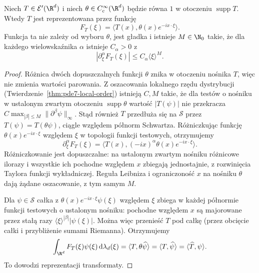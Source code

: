 \begin{lemat}
\label{lem:pde31-compact-fourier}
Niech $T\in\mathcal E'(\R^d)$ i niech
$\theta\in C_c^\infty(\R^d)$ będzie równa $1$
w otoczeniu $\operatorname{supp}T$. Wtedy
$\widehat T$ jest reprezentowana przez funkcję
\[
 F_T(\xi)=\langle T(x),\theta(x)e^{-ix\cdot\xi}\rangle.
\]
Funkcja ta nie zależy od wyboru $\theta$, jest gładka
i istnieje $M\in\N_0$ takie, że dla każdego
wielowskaźnika $\alpha$ istnieje $C_\alpha>0$ z
\[
 |\partial_\xi^\alpha F_T(\xi)|\le C_\alpha
 \langle\xi\rangle^M.
\]
\end{lemat}
\begin{proof}
Różnica dwóch dopuszczalnych funkcji $\theta$
znika w otoczeniu nośnika $T$, więc nie zmienia
wartości parowania. Z oszacowania lokalnego rzędu
dystrybucji (Twierdzenie~\ref{thm:pde7-local-order})
istnieją $C,M$ takie, że dla testów o nośniku
w ustalonym zwartym otoczeniu $\operatorname{supp}\theta$
wartość $|T(\psi)|$ nie przekracza
$C\max_{|\beta|\le M}\|\partial^\beta\psi\|_\infty$.
Stąd również $T$ przedłuża się na $\mathcal S$
przez $T(\psi)=T(\theta\psi)$, ciągle względem
półnorm Schwartza.
Różniczkując funkcję $\theta(x)e^{-ix\cdot\xi}$
względem $\xi$ w topologii funkcji testowych,
otrzymujemy
\[
 \partial_\xi^\alpha F_T(\xi)
 =\langle T(x),(-ix)^\alpha\theta(x)e^{-ix\cdot\xi}\rangle.
\]
Różniczkowanie jest dopuszczalne: na ustalonym zwartym
nośniku różnicowe ilorazy i wszystkie ich pochodne
względem $x$ zbiegają jednostajnie, z rozwinięcia
Taylora funkcji wykładniczej.
Reguła Leibniza i ograniczoność $x$ na nośniku
$\theta$ dają żądane oszacowanie, z tym samym $M$.

Dla $\psi\in\mathcal S$ całka z
$\theta(x)e^{-ix\cdot\xi}\psi(\xi)$ względem $\xi$
zbiega w każdej półnormie funkcji testowych
o ustalonym nośniku: pochodne względem $x$
są majorowane przez stałą razy
$\langle\xi\rangle^{|\beta|}|\psi(\xi)|$.
Można więc przenieść $T$ pod całkę
(przez obcięcie całki i przybliżenie sumami Riemanna).
Otrzymujemy
\[
 \int_{\R^d}F_T(\xi)\psi(\xi)\,\mathrm d\lambda_d(\xi)
 =\langle T,\theta\widehat\psi\rangle
 =\langle T,\widehat\psi\rangle
 =\langle\widehat T,\psi\rangle.
\]
To dowodzi reprezentacji transformaty.
\end{proof}


